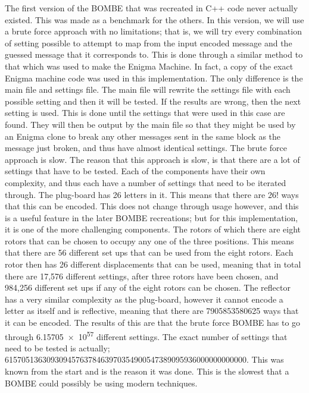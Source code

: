\documentclass[12pt,a4paper]{article}
\begin{document}
The first version of the BOMBE that was recreated in C++ code never actually existed. This was made as a benchmark for the others. In this version, we will use a brute force approach with no limitations; that is, we will try every combination of setting possible to attempt to map from the input encoded message and the guessed message that it corresponds to. This is done through a similar method to that which was used to make the Enigma Machine. In fact, a copy of the exact Enigma machine code was used in this implementation. The only difference is the main file and settings file. The main file will rewrite the settings file with each possible setting and then it will be tested. If the results are wrong, then the next setting is used. This is done until the settings that were used in this case are found. They will then be output by the main file so that they might be used by an Enigma clone to break any other messages sent in the same block as the message just broken, and thus have almost identical settings. The brute force approach is slow. The reason that this approach is slow, is that there are a lot of settings that have to be tested. Each of the components have their own complexity, and thus each have a number of settings that need to be iterated through. The plug-board has 26 letters in it. This means that there are 26! ways that this can be encoded. This does not change through usage however, and this is a useful feature in the later BOMBE recreations; but for this implementation, it is one of the more challenging components. The rotors of which there are eight rotors that can be chosen to occupy any one of the three positions. This means that there are 56 different set ups that can be used from the eight rotors. Each rotor then has 26 different displacements that can be used, meaning that in total there are 17,576 different settings, after three rotors have been chosen, and 984,256 different set ups if any of the eight rotors can be chosen. The reflector has a very similar complexity as the plug-board, however it cannot encode a letter as itself and is reflective, meaning that there are \num{7905853580625} ways that it can be encoded. The results of this are that the brute force BOMBE has to go through \num{6.15705e57} different settings. The exact number of settings that need to be tested is actually; \num{6157051363093094576378463970354900547389095936000000000000}. This was known from the start and is the reason it was done. This is the slowest that a BOMBE could possibly be using modern techniques. \\
\end{document}
